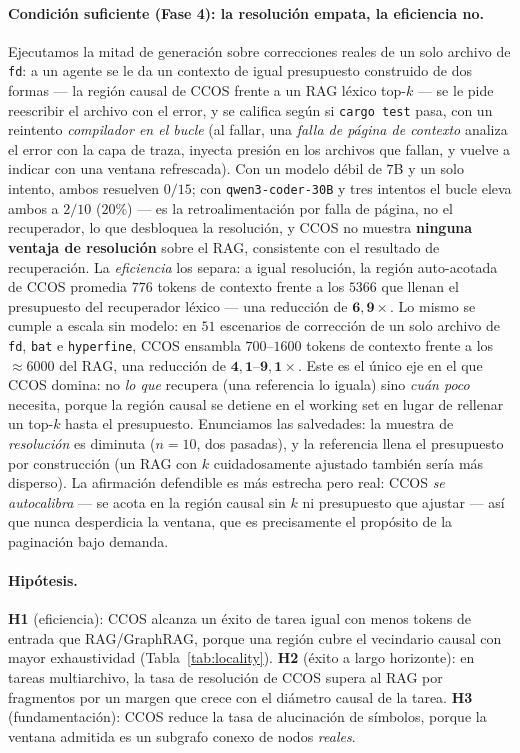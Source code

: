 \documentclass[11pt]{article}
\newcommand{\code}[1]{\texttt{#1}}
\begin{document}
\paragraph{Condición suficiente (Fase 4): la resolución empata, la eficiencia no.}
Ejecutamos la mitad de generación sobre correcciones reales de un solo archivo de
\code{fd}: a un agente se le da un contexto de igual presupuesto construido de dos
formas --- la región causal de CCOS frente a un RAG léxico top-$k$ --- se le pide
reescribir el archivo con el error, y se califica según si \code{cargo test} pasa, con
un reintento \emph{compilador en el bucle} (al fallar, una \emph{falla de página de
contexto} analiza el error con la capa de traza, inyecta presión en los archivos que
fallan, y vuelve a indicar con una ventana refrescada). Con un modelo débil de $7$B y un
solo intento, ambos resuelven $0/15$; con \code{qwen3-coder-30B} y tres intentos el
bucle eleva ambos a $2/10$ ($20\%$) --- es la retroalimentación por falla de página, no
el recuperador, lo que desbloquea la resolución, y CCOS no muestra \textbf{ninguna
ventaja de resolución} sobre el RAG, consistente con el resultado de recuperación. La
\emph{eficiencia} los separa: a igual resolución, la región auto-acotada de CCOS
promedia $776$ tokens de contexto frente a los $5366$ que llenan el presupuesto del
recuperador léxico --- una reducción de $\mathbf{6{,}9\times}$. Lo mismo se cumple a
escala sin modelo: en $51$ escenarios de corrección de un solo archivo de \code{fd},
\code{bat} e \code{hyperfine}, CCOS ensambla $700$--$1600$ tokens de contexto frente a
los $\approx\!6000$ del RAG, una reducción de $\mathbf{4{,}1}$--$\mathbf{9{,}1\times}$.
Este es el único eje en el que CCOS domina: no \emph{lo que} recupera (una referencia lo
iguala) sino \emph{cuán poco} necesita, porque la región causal se detiene en el working
set en lugar de rellenar un top-$k$ hasta el presupuesto. Enunciamos las salvedades: la
muestra de \emph{resolución} es diminuta ($n{=}10$, dos pasadas), y la referencia llena
el presupuesto por construcción (un RAG con $k$ cuidadosamente ajustado también sería
más disperso). La afirmación defendible es más estrecha pero real: CCOS
\emph{se autocalibra} --- se acota en la región causal sin $k$ ni presupuesto que
ajustar --- así que nunca desperdicia la ventana, que es precisamente el propósito de la
paginación bajo demanda.

\paragraph{Hipótesis.}
\textbf{H1} (eficiencia): CCOS alcanza un éxito de tarea igual con menos tokens de
entrada que RAG/GraphRAG, porque una región cubre el vecindario causal con mayor
exhaustividad (Tabla~\ref{tab:locality}).
\textbf{H2} (éxito a largo horizonte): en tareas multiarchivo, la tasa de resolución de
CCOS supera al RAG por fragmentos por un margen que crece con el diámetro causal de la
tarea.
\textbf{H3} (fundamentación): CCOS reduce la tasa de alucinación de símbolos, porque la
ventana admitida es un subgrafo conexo de nodos \emph{reales}.
\end{document}
